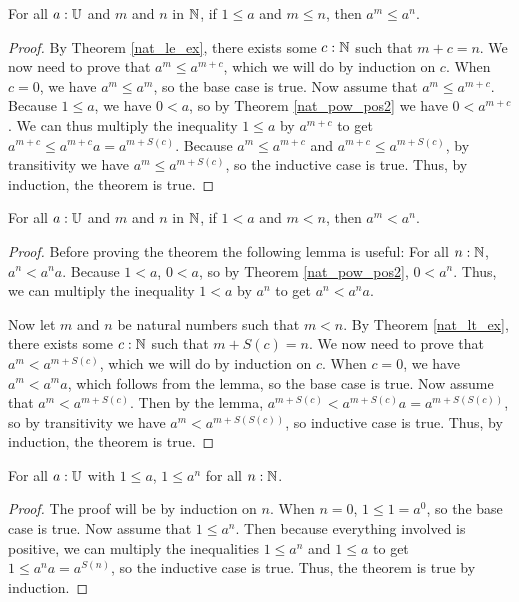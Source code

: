 \documentclass[../math.tex]{subfiles}
\begin{document}
\begin{theorem}
    For all $a : \mathbb{U}$ and $m$ and $n$ in $\mathbb{N}$, if $1 \leq a$ and $m \leq n$, then
    $a^m \leq a^n$.
\end{theorem}
\begin{proof}
    By Theorem \ref{nat_le_ex}, there exists some $c : \mathbb{N}$ such that $m + c =
    n$.  We now need to prove that $a^m \leq a^{m + c}$, which we will do by
    induction on $c$.  When $c = 0$, we have $a^m \leq a^m$, so the base case is
    true.  Now assume that $a^m \leq a^{m + c}$.  Because $1 \leq a$, we have $0
    < a$, so by Theorem \ref{nat_pow_pos2} we have $0 < a^{m + c}$.  We can thus
    multiply the inequality $1 \leq a$ by $a^{m + c}$ to get $a^{m + c} \leq
    a^{m + c}a = a^{m + S(c)}$.  Because $a^m \leq a^{m + c}$ and $a^{m + c}
    \leq a^{m + S(c)}$, by transitivity we have $a^m \leq a^{m + S(c)}$, so the
    inductive case is true.  Thus, by induction, the theorem is true.
\end{proof}

\begin{theorem}
    For all $a : \mathbb{U}$ and $m$ and $n$ in $\mathbb{N}$, if $1 < a$ and $m < n$, then $a^m
    < a^n$.
\end{theorem}
\begin{proof}
    Before proving the theorem the following lemma is useful: For all $n : \mathbb{N}$,
    $a^n < a^na$.  Because $1 < a$, $0 < a$, so by Theorem \ref{nat_pow_pos2},
    $0 < a^n$.  Thus, we can multiply the inequality $1 < a$ by $a^n$ to get
    $a^n < a^na$.

    Now let $m$ and $n$ be natural numbers such that $m < n$.  By Theorem
    \ref{nat_lt_ex}, there exists some $c : \mathbb{N}$ such that $m + S(c) = n$.  We
    now need to prove that $a^m < a^{m + S(c)}$, which we will do by induction
    on $c$.  When $c = 0$, we have $a^m < a^ma$, which follows from the lemma,
    so the base case is true.  Now assume that $a^m < a^{m + S(c)}$.  Then by
    the lemma, $a^{m + S(c)} < a^{m + S(c)}a = a^{m + S(S(c))}$, so by
    transitivity we have $a^m < a^{m + S(S(c))}$, so inductive case is true.
    Thus, by induction, the theorem is true.
\end{proof}

\begin{theorem} \label{nat_pow_le_one}
    For all $a : \mathbb{U}$ with $1 \leq a$, $1 \leq a^n$ for all $n : \mathbb{N}$.
\end{theorem}
\begin{proof}
    The proof will be by induction on $n$.  When $n = 0$, $1 \leq 1 = a^0$, so
    the base case is true.  Now assume that $1 \leq a^n$.  Then because
    everything involved is positive, we can multiply the inequalities $1 \leq
    a^n$ and $1 \leq a$ to get $1 \leq a^na = a^{S(n)}$, so the inductive case
    is true.  Thus, the theorem is true by induction.
\end{proof}
\end{document}
